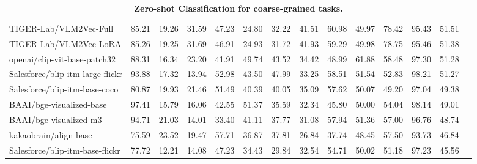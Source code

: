 \begin{table*}
{\begin{tabular}{lccccccccccccc}
TIGER-Lab/VLM2Vec-Full &85.21 &19.26 &31.59 &47.23 &24.80 &32.22 &41.51 &60.98 &49.97 &78.42 &95.43 &51.51 \\
TIGER-Lab/VLM2Vec-LoRA &85.26 &19.25 &31.69 &46.91 &24.93 &31.72 &41.93 &59.29 &49.98 &78.75 &95.46 &51.38 \\
openai/clip-vit-base-patch32 &88.31 &16.34 &23.20 &41.91 &49.74 &43.52 &34.42 &48.99 &61.88 &58.48 &97.30 &51.28 \\
Salesforce/blip-itm-large-flickr &93.88 &17.32 &13.94 &52.98 &43.50 &47.99 &33.25 &58.51 &51.54 &52.83 &98.21 &51.27 \\
Salesforce/blip-itm-base-coco &80.87 &19.93 &21.46 &51.49 &40.39 &40.05 &35.09 &57.62 &50.07 &49.20 &97.04 &49.38 \\
BAAI/bge-visualized-base &97.41 &15.79 &16.06 &42.55 &51.37 &35.59 &32.34 &45.80 &50.00 &54.04 &98.14 &49.01 \\
BAAI/bge-visualized-m3 &94.71 &21.03 &14.01 &33.40 &41.11 &37.77 &31.08 &57.94 &51.36 &57.00 &96.76 &48.74 \\
kakaobrain/align-base &75.59 &23.52 &19.47 &57.71 &36.87 &37.81 &26.84 &37.74 &48.45 &57.50 &93.73 &46.84 \\
Salesforce/blip-itm-base-flickr &77.72 &12.21 &14.08 &47.23 &34.43 &29.84 &32.54 &54.71 &50.02 &51.18 &97.23 &45.56 \\
\bottomrule
\end{tabular}}
\caption{\textbf{Zero-shot Classification for coarse-grained tasks.}}\label{tab: ZeroShot coarse}
\end{table*}